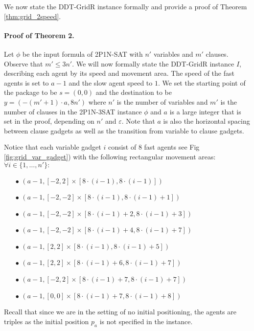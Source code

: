  We now state the DDT-GridR instance formally and provide a proof of Theorem \ref{thm:grid_2speed}.

\paragraph*{Proof of Theorem 2.}
\label{sec:appendixddtgrapx}


Let $\phi$ be the input formula of \textsc{2P1N-SAT} with $n'$ variables and $m'$ clauses. Observe that $m' \leq 3n'$.  %
We will now formally state the DDT-GridR instance $I$, describing each agent by its speed and movement area. The speed of the fast agents is set to $a-1$ and the slow agent speed to $1$. We set the starting point of the package to be $s = (0,0)$ and the destination to be $y = (-(m'+1)\cdot a,8n')$ where $n'$ is the number of variables and $m'$ is the number of clauses in the \textsc{2P1N-3SAT} instance $\phi$ and $a$ is a large integer that is set in the proof, depending on $n'$ and $\varepsilon$. Note that $a$ is also the horizontal spacing between clause gadgets as well as the transition from variable to clause gadgets.

Notice that each variable gadget $i$ consist of $8$ fast agents see Fig \ref{fig:grid_var_gadget}) with the following rectangular movement areas: $\forall i \in \{1, \dots, n'\}: $ 
\begin{itemize}
    \item[$\bullet$] $(a-1, [-2, 2] \times [8\cdot(i-1), 8\cdot(i-1)])$
    \item[$\bullet$] $ (a-1, [-2, -2] \times [8\cdot(i-1), 8\cdot(i-1)+1])$
    \item[$\bullet$] $(a-1, [-2,-2] \times [ 8\cdot(i-1)+2, 8\cdot(i-1)+3])$ 
    \item[$\bullet$] $(a-1, [-2, -2] \times [8\cdot(i-1)+4, 8\cdot(i-1)+7])$ 
    \item[$\bullet$] $(a-1, [2, 2] \times [8\cdot(i-1), 8\cdot(i-1)+5])$
    \item[$\bullet$] $(a-1, [2, 2] \times [8\cdot(i-1)+6, 8\cdot(i-1)+7])$
    \item[$\bullet$] $(a-1, [-2, 2] \times [8\cdot(i-1)+7, 8\cdot(i-1)+7])$
    \item[$\bullet$] $(a-1, [0, 0] \times [8\cdot(i-1)+7, 8\cdot(i-1)+8])$
\end{itemize}
Recall that since we are in the setting of no initial positioning, the agents are triples as the initial position $p_a$ is not specified in the instance.

